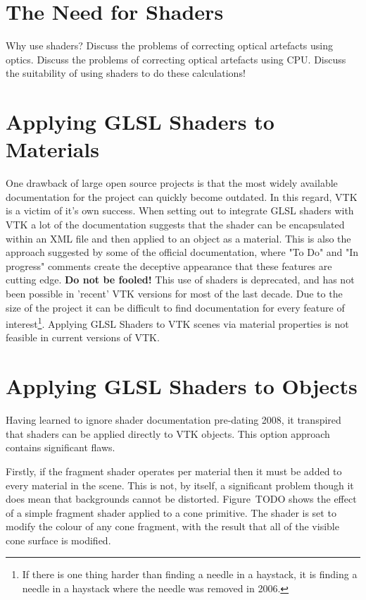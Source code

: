 \documentclass[MSc,paper=a4,pagesize=auto]{icldt}
\begin{document}
\section{The Need for Shaders}
\label{sec:need_for_shaders}
Why use shaders?
Discuss the problems of correcting optical artefacts using optics.
Discuss the problems of correcting optical artefacts using CPU. 
Discuss the suitability of using shaders to do these calculations!

\section{Applying GLSL Shaders to Materials}
One drawback of large open source projects is that the most widely available documentation for the project can quickly become outdated. In this regard, VTK is a victim of it's own success. When setting out to integrate GLSL shaders with VTK a lot of the documentation suggests that the shader can be encapsulated within an XML file and then applied to an object as a material. This is also the approach suggested by some of the official documentation, where "To Do" and "In progress" comments create the deceptive appearance that these features are cutting edge. \textbf{Do not be fooled!} This use of shaders is deprecated, and has not been possible in 'recent' VTK versions for most of the last decade. Due to the size of the project it can be difficult to find documentation for every feature of interest\footnote{If there is one thing harder than finding a needle in a haystack, it is finding a needle in a haystack where the needle was removed in 2006.}. 
Applying GLSL Shaders to VTK scenes via material properties is not feasible in current versions of VTK.


\section{Applying GLSL Shaders to Objects}
Having learned to ignore shader documentation pre-dating 2008, it transpired that shaders can be applied directly to VTK objects. This option approach contains  significant flaws. 

Firstly, if the fragment shader operates per material then it must be added to every material in the scene. This is not, by itself, a significant problem though it does mean that backgrounds cannot be distorted. Figure~TODO shows the effect of a simple fragment shader applied to a cone primitive. The shader is set to modify the colour of any cone fragment, with the result that all of the visible cone surface is modified.
\end{document}
